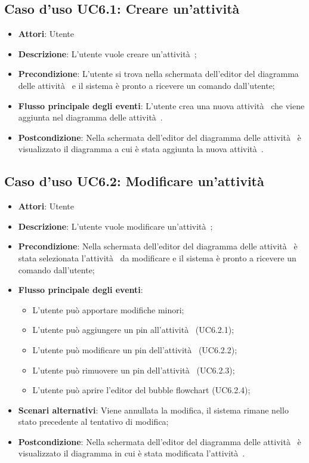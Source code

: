 \documentclass[../AnalisiDeiRequisiti.tex]{subfiles}
\begin{document}
				\subsection{Caso d'uso UC6.1: Creare un'attività }
				\begin{itemize}
					\item \textbf{Attori}: Utente
					\item \textbf{Descrizione}: L'utente vuole creare un'attività ;
					\item \textbf{Precondizione}: L'utente si trova nella schermata dell'editor del diagramma delle attività  e il sistema è pronto a ricevere un comando dall'utente;
					\item \textbf{Flusso principale degli eventi}: L'utente crea una nuova attività  che viene aggiunta nel diagramma delle attività .
					\item \textbf{Postcondizione}: Nella schermata dell'editor del diagramma delle attività  è visualizzato il diagramma a cui è stata aggiunta la nuova attività .
				\end{itemize}
				\subsection{Caso d'uso UC6.2: Modificare un'attività }
				\begin{itemize}
					\item \textbf{Attori}: Utente
					\item \textbf{Descrizione}: L'utente vuole modificare un'attività ;
					\item \textbf{Precondizione}: Nella schermata dell'editor del diagramma delle attività  è stata selezionata l'attività  da modificare e il sistema è pronto a ricevere un comando dall'utente;
					\item \textbf{Flusso principale degli eventi}: \begin{itemize}
						\item L'utente può apportare modifiche minori;
						\item L'utente può aggiungere un pin all'attività  (UC6.2.1);
						\item L'utente può modificare un pin dell'attività  (UC6.2.2);
						\item L'utente può rimuovere un pin dell'attività  (UC6.2.3);
						\item L'utente può aprire l'editor del bubble flowchart (UC6.2.4);
					\end{itemize}
					\item \textbf{Scenari alternativi}: Viene annullata la modifica, il sistema rimane nello stato precedente al tentativo di modifica;
					\item \textbf{Postcondizione}: Nella schermata dell'editor del diagramma delle attività  è visualizzato il diagramma in cui è stata modificata l'attività .
				\end{itemize}
\end{document}
